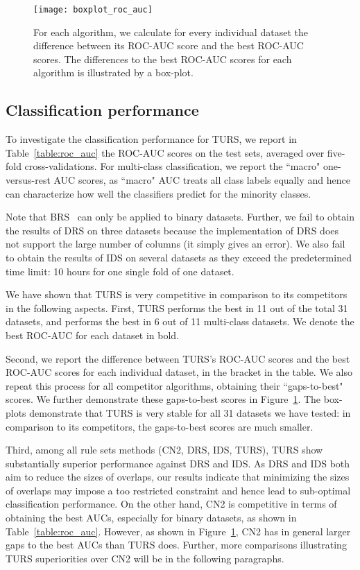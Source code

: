 \begin{figure}[ht]
\texttt{[image: boxplot\_roc\_auc]}	
\caption{For each algorithm, we calculate for every individual dataset the difference between its ROC-AUC score and the best ROC-AUC scores. The differences to the best ROC-AUC scores for each algorithm is illustrated by a box-plot.} \label{fig:diff_to_best_auc}
\end{figure}

\subsection{Classification performance}
To investigate the classification performance for TURS, we report  in Table~\ref{table:roc_auc} the ROC-AUC scores on the test sets, averaged over five-fold cross-validations. For multi-class classification, we report the ``macro" one-versus-rest AUC scores, as ``macro" AUC treats all class labels equally and hence can characterize how well the classifiers predict for the minority classes. 

Note that BRS~\citep{wang2017bayesian} can only be applied to binary datasets. Further, we fail to obtain the results of DRS on three datasets because the implementation of DRS does not support the large number of columns (it simply gives an error). We also fail to obtain the results of IDS on several datasets as they exceed the predetermined time limit: 10 hours for one single fold of one dataset. 

We have shown that TURS is very competitive in comparison to its competitors in the following aspects. First, TURS performs the best in 11 out of the total 31 datasets, and performs the best in 6 out of 11 multi-class datasets. We denote the best ROC-AUC for each dataset in bold. 

Second, we report the difference between TURS's ROC-AUC scores and the best ROC-AUC scores for each individual dataset, in the bracket in the table. We also repeat this process for all competitor algorithms, obtaining their ``gaps-to-best" scores. We further demonstrate these gaps-to-best scores in Figure~\ref{fig:diff_to_best_auc}. The box-plots demonstrate that TURS is very stable for all 31 datasets we have tested: in comparison to its competitors, the gaps-to-best scores are much smaller. 

Third, among all rule sets methods (CN2, DRS, IDS, TURS), TURS show substantially superior performance against DRS and IDS. As DRS and IDS both aim to reduce the sizes of overlaps, our results indicate that minimizing the sizes of overlaps may impose a too restricted constraint and hence lead to sub-optimal classification performance. On the other hand, CN2 is competitive in terms of obtaining the best AUCs, especially for binary datasets, as shown in Table~\ref{table:roc_auc}. However,  as shown in Figure~\ref{fig:diff_to_best_auc}, CN2 has in general larger gaps to the best AUCs than TURS does. Further, more comparisons illustrating TURS superiorities over CN2 will be in the following paragraphs. 

